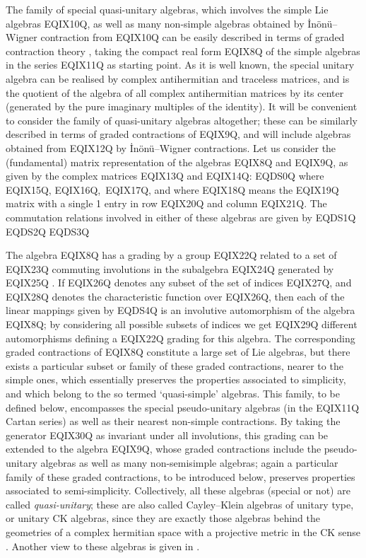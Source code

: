 The family of special quasi-unitary algebras, which involves the simple
Lie algebras EQIX10Q, as well as many non-simple algebras obtained
by \.In\"on\"u--Wigner \cite{Ino.Wig:53} contraction from EQIX10Q can be
easily described in terms of graded contraction theory
\cite{Mon.Pat:91,Moo.Pat:91}, taking the compact real form
EQIX8Q of the simple algebras in the series
EQIX11Q as starting point. As it is well known, the special unitary algebra
can be realised by complex antihermitian and traceless matrices, and is the
quotient of the algebra of all complex antihermitian matrices by its
center (generated by the pure imaginary multiples of the identity). It
 will be convenient to consider the family of quasi-unitary algebras
altogether; these can be similarly described in terms of graded
contractions of EQIX9Q, and will include algebras obtained from EQIX12Q
by \.In\"on\"u--Wigner contractions. Let us consider the (fundamental)
matrix representation of the algebras
EQIX8Q and
EQIX9Q, as given by the complex matrices
EQIX13Q and EQIX14Q:
EQDS0Q
where EQIX15Q, EQIX16Q,\  EQIX17Q, and where EQIX18Q means
the EQIX19Q matrix with a single  1 entry in row EQIX20Q and
column EQIX21Q. The commutation relations involved in either of these
algebras are given by
EQDS1Q
EQDS2Q
EQDS3Q

The algebra EQIX8Q has a grading by a group
EQIX22Q
related to a set of EQIX23Q commuting involutions in the
subalgebra EQIX24Q generated by EQIX25Q
\cite{Her.Mon.Olm.San:94,Her.San:96b}.
If EQIX26Q denotes any subset of the set of indices EQIX27Q,
and EQIX28Q denotes the characteristic function over EQIX26Q,
then each of the linear mappings given by
EQDS4Q
is an involutive automorphism of the algebra EQIX8Q; by
considering all possible subsets of indices we get EQIX29Q different
automorphisms defining a EQIX22Q grading for this
algebra. The corresponding graded contractions of
EQIX8Q constitute a large set of Lie algebras, but there exists
a particular subset or family of these graded contractions, nearer
to the simple ones, which essentially
preserves the properties
associated to simplicity, and which belong to the so termed
\cite{Roz:88, Roz:97} `quasi-simple' algebras. This family, to be defined
below, encompasses the special pseudo-unitary algebras (in the EQIX11Q Cartan
series)  as well as their nearest non-simple contractions. By taking the
generator EQIX30Q as invariant under all involutions, this grading can
be extended to the algebra EQIX9Q, whose graded contractions include the
pseudo-unitary algebras as well as many non-semisimple algebras;  again a
particular family of these graded contractions, to be introduced below,
preserves properties associated to semi-simplicity.  Collectively, all these
algebras (special or not) are called
\emph{quasi-unitary}; these are also called Cayley--Klein algebras of unitary
type, or unitary CK algebras, since they are exactly those
algebras behind the geometries of a complex hermitian space  with a
projective metric in the CK sense \cite{Roz:97}. Another
view to these algebras is given in \cite{Gro.Man:90}.

